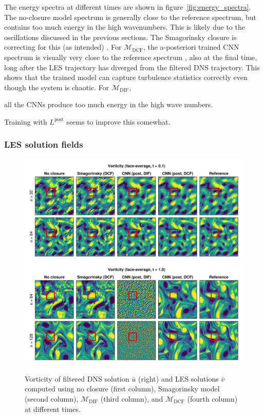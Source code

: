 \documentclass[preprint]{elsarticle}
\newcommand{\revtwo}[1]{#1}
\newcommand{\revboth}[1]{#1}
\begin{document}
The energy spectra at \revtwo{ different times} are shown in
figure~\ref{fig:energy_spectra}.
The no-closure model spectrum is generally close to
the reference spectrum, but contains too much energy in the high wavenumbers.
This is likely due to the oscillations discussed in the previous sections.
The Smagorinsky closure is correcting for this (as intended)
\revtwo{}.
For $\mathcal{M}_{\text{DCF}}$,
the a-posteriori trained CNN spectrum is visually very close to the reference
spectrum
\revtwo{, also at the final time, long after the LES trajectory has 
diverged from the filtered DNS trajectory. This shows that the trained model
can capture turbulence statistics correctly even though the system is chaotic.}
For $\mathcal{M}_{\text{DIF}}$, 
\revtwo{
    
    all the CNNs produce too much energy in the high wave numbers.
}
Training with $L^\text{post}$ seems to improve this somewhat.
    
\subsubsection{LES solution fields}

\begin{figure}
    \centering
    \includegraphics[width=\textwidth]{figures_kolmogorov_les_fields_itime=1_filter=FaceAverage.png}
    \includegraphics[width=\textwidth]{figures_kolmogorov_les_fields_itime=3_filter=FaceAverage.png}
    \caption{
        Vorticity of filtered DNS solution $\bar{u}$ (right) and LES solutions
        $\bar{v}$ computed using
        no closure (first column),
        Smagorinsky model (second column),
        $\mathcal{M}_{\text{DIF}}$ (third column),
        and $\mathcal{M}_{\text{DCF}}$ (fourth column)
        at \revboth{ different times}.
    }
    \label{fig:les_fields}
\end{figure}
\end{document}

